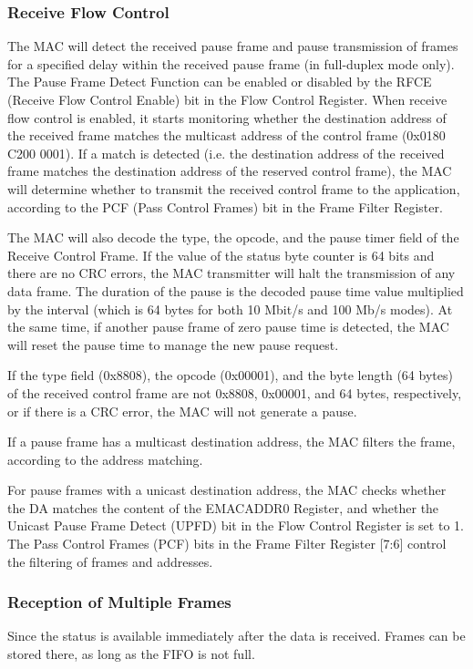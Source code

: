 \documentclass[main\_\_EN.tex]{subfiles}
\begin{document}
\subsubsection{Receive Flow Control}
The MAC will detect the received pause frame and pause transmission of frames for a specified delay within the received pause frame (in full-duplex mode only). The Pause Frame Detect Function can be enabled or disabled by the RFCE (Receive Flow Control Enable) bit in the Flow Control Register. When receive flow control is enabled, it starts monitoring whether the destination address of the received frame matches the multicast address of the control frame (0x0180 C200 0001). If a match is detected (i.e. the destination address of the received frame matches the destination address of the reserved control frame), the MAC will determine whether to transmit the received control frame to the application, according to the PCF (Pass Control Frames) bit in the Frame Filter Register.

The MAC will also decode the type, the opcode, and the pause timer field of the Receive Control Frame. If the value of the status byte counter is 64 bits and there are no CRC errors, the MAC transmitter will halt the transmission of any data frame. The duration of the pause is the decoded pause time value multiplied by the interval (which is 64 bytes for both 10 Mbit/s and 100 Mb/s modes). At the same time, if another pause frame of zero pause time is detected, the MAC will reset the pause time to manage the new pause request.

If the type field (0x8808), the opcode (0x00001), and the byte length (64 bytes) of the received control frame  are not 0x8808, 0x00001, and 64 bytes, respectively, or if there is a CRC error, the MAC will not generate a pause.

If a pause frame has a multicast destination address, the MAC filters the frame, according to the address matching.

For pause frames with a unicast destination address, the MAC checks whether the DA matches the content of the EMACADDR0 Register, and whether the Unicast Pause Frame Detect (UPFD) bit in the Flow Control Register is set to 1. The Pass Control Frames (PCF) bits in the Frame Filter Register [7:6] control the filtering of frames and addresses.

\subsubsection{Reception of Multiple Frames}
Since the status is available immediately after the data is received. Frames can be stored there, as long as the FIFO is not full.
\end{document}
